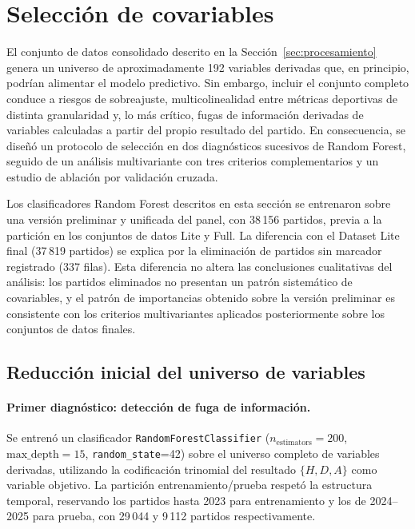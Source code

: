 
\section{Selecci\'on de covariables}
\label{sec:seleccion_covariables}

El conjunto de datos consolidado descrito en la Secci\'on~\ref{sec:procesamiento} genera un universo de aproximadamente 192 variables derivadas que, en principio, podr\'ian alimentar el modelo predictivo. Sin embargo, incluir el conjunto completo conduce a riesgos de sobreajuste, multicolinealidad entre m\'etricas deportivas de distinta granularidad y, lo m\'as cr\'itico, fugas de informaci\'on derivadas de variables calculadas a partir del propio resultado del partido. En consecuencia, se dise\~n\'o un protocolo de selecci\'on en dos diagn\'osticos sucesivos de Random Forest, seguido de un an\'alisis multivariante con tres criterios complementarios y un estudio de ablaci\'on por validaci\'on cruzada.

\begin{obs}
	\label{obs:version_rf}
	Los clasificadores Random Forest descritos en esta secci\'on se entrenaron sobre una versi\'on preliminar y unificada del panel, con 38\,156 partidos, previa a la partici\'on en los conjuntos de datos Lite y Full. La diferencia con el Dataset Lite final (37\,819 partidos) se explica por la eliminaci\'on de partidos sin marcador registrado (337 filas). Esta diferencia no altera las conclusiones cualitativas del an\'alisis: los partidos eliminados no presentan un patr\'on sistem\'atico de covariables, y el patr\'on de importancias obtenido sobre la versi\'on preliminar es consistente con los criterios multivariantes aplicados posteriormente sobre los conjuntos de datos finales.
\end{obs}

\subsection{Reducci\'on inicial del universo de variables}
\label{subsec:primera_pasada}
\label{subsec:segunda_pasada}

\paragraph{Primer diagn\'ostico: detecci\'on de fuga de informaci\'on.} Se entren\'o un clasificador \texttt{RandomForestClassifier} ($n_{\text{estimators}}=200$, $\text{max\_depth}=15$, \texttt{random\_state}=42) sobre el universo completo de variables derivadas, utilizando la codificaci\'on trinomial del resultado $\{H,D,A\}$ como variable objetivo. La partici\'on entrenamiento/prueba respet\'o la estructura temporal, reservando los partidos hasta 2023 para entrenamiento y los de 2024--2025 para prueba, con 29\,044 y 9\,112 partidos respectivamente.

